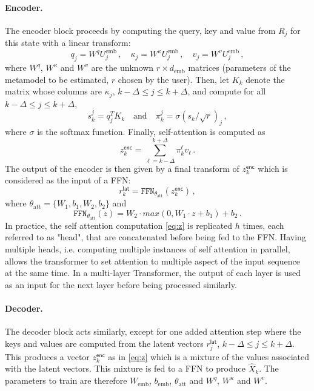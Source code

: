 \documentclass[12pt]{article}
\newcommand{\eqsp}{\,}
\begin{document}
\paragraph{Encoder.}
The encoder block proceeds by computing the query, key and value from $R_j$ for this state with a linear transform:
\begin{equation}
    \label{eq:qkv}
    q_j =  W^{q} U^{\mathrm{emb}}_j\eqsp,\quad \kappa_j =  W^{\kappa} U^{\mathrm{emb}}_j\eqsp,\quad v_j =  W^{v} U^{\mathrm{emb}}_j \eqsp,
\end{equation}
where $W^{q}$, $W^{\kappa}$ and $W^{v}$ are the unknown $r\times d_{\mathrm{emb}}$ matrices (parameters of the metamodel to be estimated, $r$ chosen by the user). Then, let $K_k$ denote the matrix whose columns are $\kappa_j$, $k-\Delta\leqslant j\leqslant k + \Delta$,  and compute for all $k-\Delta\leqslant j\leqslant k+\Delta$,
$$
    s_k^{j} = q_j^TK_k \quad\mbox{and}\quad \pi_k^{j}= \sigma(s_k/\sqrt{r})_j\eqsp,
$$
where $\sigma$ is the softmax function. Finally, self-attention is computed as
\begin{equation}
    \label{eq:z}
    z^{\mathsf{enc}}_k =  \sum_{\ell=k-\Delta}^{k+\Delta}\pi_k^{\ell}v_\ell\eqsp.
\end{equation}
The output of the encoder is then given by a final transform of $z^{\mathsf{enc}}_k$ which is considered as the input of a FFN:
$$
    r^{\mathsf{lat}}_k = \texttt{FFN}_{\theta_{\mathrm{att}}}(z^{\mathsf{enc}}_k)\eqsp,
$$
where $\theta_{\mathrm{att}} = \{W_1,b_1,W_2,b_2\}$ and
$$
    \texttt{FFN}_{\theta_{\mathrm{att}}}(z) = W_2 \cdot max(0, W_1 \cdot z + b_1)  + b_2\,.
$$
In practice, the self attention computation \eqref{eq:z} is replicated $h$ times, each referred to as "head", that are concatenated before being fed to the FFN. Having multiple heads, i.e. computing multiple instances of self attention in parallel, allows the transformer to set attention to multiple aspect of the input sequence at the same time. In a multi-layer Transformer, the output of each layer is used as an input for the next layer before being processed similarly.

\paragraph{Decoder.} The decoder block acts similarly, except for one added attention step where the keys and values are computed from the latent vectors $r^{\mathsf{lat}}_j$, $k-\Delta\leqslant j \leqslant k+\Delta$.
This produces a vector $z^{\mathsf{enc}}_k$ as in \eqref{eq:z} which is a mixture of the values associated with the latent vectors. This mixture is fed to a FFN to produce $\widehat X_k$.  The parameters to train are therefore $W_{\mathrm{emb}}$, $b_{\mathrm{emb}}$, $\theta_{\mathrm{att}}$ and $W^{q}$, $W^{\kappa}$ and $W^{v}$.
\end{document}
